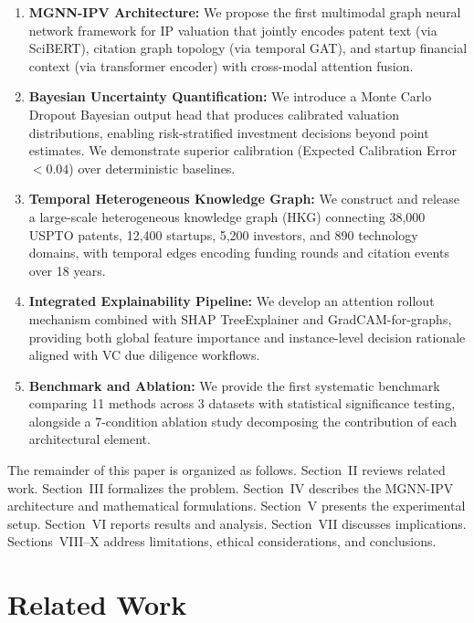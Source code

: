 \documentclass[journal]{IEEEtran}
\begin{document}
\begin{enumerate}
    \item \textbf{MGNN-IPV Architecture:} We propose the first multimodal graph neural network framework for IP valuation that jointly encodes patent text (via SciBERT), citation graph topology (via temporal GAT), and startup financial context (via transformer encoder) with cross-modal attention fusion.

    \item \textbf{Bayesian Uncertainty Quantification:} We introduce a Monte Carlo Dropout Bayesian output head that produces calibrated valuation distributions, enabling risk-stratified investment decisions beyond point estimates. We demonstrate superior calibration (Expected Calibration Error $< 0.04$) over deterministic baselines.

    \item \textbf{Temporal Heterogeneous Knowledge Graph:} We construct and release a large-scale heterogeneous knowledge graph (HKG) connecting 38,000 USPTO patents, 12,400 startups, 5,200 investors, and 890 technology domains, with temporal edges encoding funding rounds and citation events over 18 years.

    \item \textbf{Integrated Explainability Pipeline:} We develop an attention rollout mechanism combined with SHAP TreeExplainer and GradCAM-for-graphs, providing both global feature importance and instance-level decision rationale aligned with VC due diligence workflows.

    \item \textbf{Benchmark and Ablation:} We provide the first systematic benchmark comparing 11 methods across 3 datasets with statistical significance testing, alongside a 7-condition ablation study decomposing the contribution of each architectural element.
\end{enumerate}

The remainder of this paper is organized as follows. Section~II reviews related work. Section~III formalizes the problem. Section~IV describes the MGNN-IPV architecture and mathematical formulations. Section~V presents the experimental setup. Section~VI reports results and analysis. Section~VII discusses implications. Sections~VIII--X address limitations, ethical considerations, and conclusions.

\section{Related Work}
\end{document}
